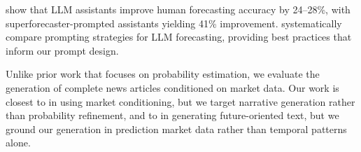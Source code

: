  \citet{aiaugmented2024} show that LLM assistants improve human forecasting accuracy by 24--28\%, with superforecaster-prompted assistants yielding 41\% improvement. \citet{promptforecasting2025} systematically compare prompting strategies for LLM forecasting, providing best practices that inform our prompt design.

 Unlike prior work that focuses on probability estimation, we evaluate the generation of complete news articles conditioned on market data. Our work is closest to \citet{mentionmarkets2026} in using market conditioning, but we target narrative generation rather than probability refinement, and to \citet{timer1_2025} in generating future-oriented text, but we ground our generation in prediction market data rather than temporal patterns alone.
